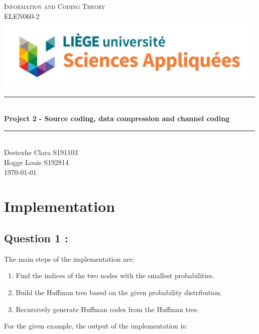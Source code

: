 \documentclass[titlepage]{article}
\begin{document}
\begin{titlepage}
\newcommand{\HRule}{\rule{\linewidth}{0.5mm}}
\center
\textsc{\LARGE
Information and Coding Theory 
} \\[1cm]
\textsc{\LARGE
ELEN060-2
} \\[1cm]
\includegraphics[scale=0.2]{logo.jpg} \\[3cm]
\HRule \\[0.4cm]
{ \huge \bfseries Project 2 - Source coding, data compression and channel coding \\[0.15cm] }
\HRule \\[1.5cm]
Destexhe Clara S191103 \\
Hogge Louis S192814
\\[1.5cm]
\today \\ [1cm]
\end{titlepage}

\section{Implementation}
\subsection{Question 1 : }

The main steps of the implementation are:
\begin{enumerate}
    \item Find the indices of the two nodes with the smallest probabilities.
    \item Build the Huffman tree based on the given probability distribution.
    \item Recursively generate Huffman codes from the Huffman tree.
\end{enumerate}
For the given example, the output of the implementation is:
\end{document}
